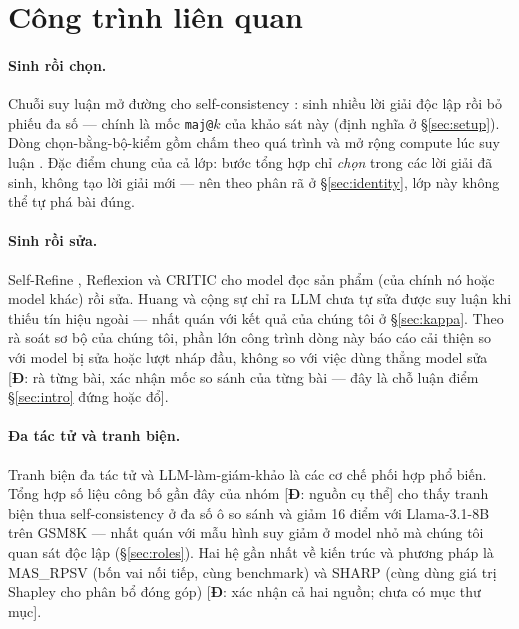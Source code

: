 \documentclass[12pt,a4paper]{article}
\newcommand{\todoD}[1]{\textcolor{red!70!black}{[\textbf{Đ}: #1]}}
\begin{document}
\section{Công trình liên quan}\label{sec:related}

\paragraph{Sinh rồi chọn.} Chuỗi suy luận \cite{wei2022} mở đường cho self-consistency
\cite{wang2023}: sinh nhiều lời giải độc lập rồi bỏ phiếu đa số --- chính là mốc
\texttt{maj@}$k$ của khảo sát này (định nghĩa ở \S\ref{sec:setup}). Dòng chọn-bằng-bộ-kiểm gồm
chấm theo quá trình \cite{lightman2024} và mở rộng compute lúc suy luận \cite{snell2024}. Đặc
điểm chung của cả lớp: bước tổng hợp chỉ \emph{chọn} trong các lời giải đã sinh, không tạo lời
giải mới --- nên theo phân rã ở \S\ref{sec:identity}, lớp này không thể tự phá bài đúng.

\paragraph{Sinh rồi sửa.} Self-Refine \cite{madaan2023}, Reflexion \cite{shinn2023} và CRITIC
\cite{gou2024} cho model đọc sản phẩm (của chính nó hoặc model khác) rồi sửa. Huang và cộng sự
\cite{huang2024} chỉ ra LLM chưa tự sửa được suy luận khi thiếu tín hiệu ngoài --- nhất quán với
kết quả của chúng tôi ở \S\ref{sec:kappa}. Theo rà soát sơ bộ của chúng tôi, phần lớn công
trình dòng này báo cáo cải thiện so với model bị sửa hoặc lượt nháp đầu, không so với việc dùng
thẳng model sửa \todoD{rà từng bài, xác nhận mốc so sánh của từng bài --- đây là chỗ luận điểm
\S\ref{sec:intro} đứng hoặc đổ}.

\paragraph{Đa tác tử và tranh biện.} Tranh biện đa tác tử \cite{du2024} và LLM-làm-giám-khảo
\cite{zheng2023} là các cơ chế phối hợp phổ biến. Tổng hợp số liệu công bố gần đây của nhóm
\todoD{nguồn cụ thể} cho thấy tranh biện thua self-consistency ở đa số ô so sánh và giảm 16
điểm với Llama-3.1-8B trên GSM8K --- nhất quán với mẫu hình suy giảm ở model nhỏ mà chúng tôi
quan sát độc lập (\S\ref{sec:roles}). Hai hệ gần nhất về kiến trúc và phương pháp là MAS\_RPSV
(bốn vai nối tiếp, cùng benchmark) và SHARP (cùng dùng giá trị Shapley cho phân bổ đóng góp)
\todoD{xác nhận cả hai nguồn; chưa có mục thư mục}.
\end{document}

